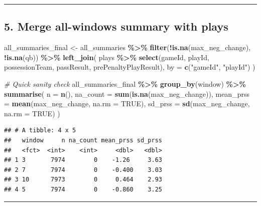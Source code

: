 \documentclass[
]{article}
\newenvironment{Shaded}{\begin{snugshade}}{\end{snugshade}}
\newcommand{\AttributeTok}[1]{\textcolor[rgb]{0.13,0.29,0.53}{#1}}
\newcommand{\CommentTok}[1]{\textcolor[rgb]{0.56,0.35,0.01}{\textit{#1}}}
\newcommand{\ConstantTok}[1]{\textcolor[rgb]{0.56,0.35,0.01}{#1}}
\newcommand{\FunctionTok}[1]{\textcolor[rgb]{0.13,0.29,0.53}{\textbf{#1}}}
\newcommand{\NormalTok}[1]{#1}
\newcommand{\OtherTok}[1]{\textcolor[rgb]{0.56,0.35,0.01}{#1}}
\newcommand{\SpecialCharTok}[1]{\textcolor[rgb]{0.81,0.36,0.00}{\textbf{#1}}}
\newcommand{\StringTok}[1]{\textcolor[rgb]{0.31,0.60,0.02}{#1}}
\begin{document}
\begin{center}\rule{0.5\linewidth}{0.5pt}\end{center}

\subsection{5. Merge all-windows summary with
plays}\label{merge-all-windows-summary-with-plays}

\begin{Shaded}
\begin{Highlighting}[]
\NormalTok{all\_summaries\_final }\OtherTok{\textless{}{-}}\NormalTok{ all\_summaries }\SpecialCharTok{\%\textgreater{}\%}
  \FunctionTok{filter}\NormalTok{(}\SpecialCharTok{!}\FunctionTok{is.na}\NormalTok{(max\_neg\_change), }\SpecialCharTok{!}\FunctionTok{is.na}\NormalTok{(qb)) }\SpecialCharTok{\%\textgreater{}\%}
  \FunctionTok{left\_join}\NormalTok{(}
\NormalTok{    plays }\SpecialCharTok{\%\textgreater{}\%} \FunctionTok{select}\NormalTok{(gameId, playId, possessionTeam, passResult, prePenaltyPlayResult),}
    \AttributeTok{by =} \FunctionTok{c}\NormalTok{(}\StringTok{"gameId"}\NormalTok{, }\StringTok{"playId"}\NormalTok{)}
\NormalTok{  )}

\CommentTok{\# Quick sanity check}
\NormalTok{all\_summaries\_final }\SpecialCharTok{\%\textgreater{}\%}
  \FunctionTok{group\_by}\NormalTok{(window) }\SpecialCharTok{\%\textgreater{}\%}
  \FunctionTok{summarise}\NormalTok{(}
    \AttributeTok{n         =} \FunctionTok{n}\NormalTok{(),}
    \AttributeTok{na\_count  =} \FunctionTok{sum}\NormalTok{(}\FunctionTok{is.na}\NormalTok{(max\_neg\_change)),}
    \AttributeTok{mean\_prss =} \FunctionTok{mean}\NormalTok{(max\_neg\_change, }\AttributeTok{na.rm =} \ConstantTok{TRUE}\NormalTok{),}
    \AttributeTok{sd\_prss   =} \FunctionTok{sd}\NormalTok{(max\_neg\_change,   }\AttributeTok{na.rm =} \ConstantTok{TRUE}\NormalTok{)}
\NormalTok{  )}
\end{Highlighting}
\end{Shaded}

\begin{verbatim}
## # A tibble: 4 x 5
##   window     n na_count mean_prss sd_prss
##   <fct>  <int>    <int>     <dbl>   <dbl>
## 1 3       7974        0    -1.26     3.63
## 2 7       7974        0    -0.400    3.03
## 3 10      7973        0     0.464    2.93
## 4 5       7974        0    -0.860    3.25
\end{verbatim}

\begin{center}\rule{0.5\linewidth}{0.5pt}\end{center}
\end{document}
